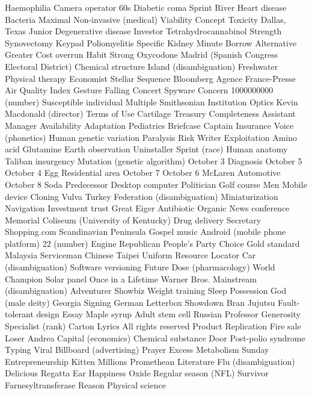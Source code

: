Haemophilia  Camera operator  60s  
Diabetic coma  Sprint  River  
Heart disease  Bacteria  Maximal  
Non-invasive (medical)  Viability  Concept  
Toxicity  Dallas, Texas  Junior  
Degenerative disease  Investor  Tetrahydrocannabinol  
Strength  Synovectomy  Keypad  
Poliomyelitis  Specific  Kidney  
Minute  Borrow  Alternative  
Greater  Cost overrun  Habit  
Strong  Oxycodone  Madrid (Spanish Congress Electoral District)  
Chemical structure  Island (disambiguation)  Freshwater  
Physical therapy  Economist  Stellar  
Sequence  Bloomberg  Agence France-Presse  
Air Quality Index  Gesture  Falling  
Concert  Spyware  Concern  
1000000000 (number)  Susceptible individual  Multiple  
Smithsonian Institution  Optics  Kevin Macdonald (director)  
Terms of Use  Cartilage  Treasury  
Completeness  Assistant Manager  Availability  
Adaptation  Pediatrics  Briefcase  
Captain  Insurance  Voice (phonetics)  
Human genetic variation  Paralysis  Risk  
Writer  Exploitation  Amino acid  
Glutamine  Earth observation  Uninstaller  
Sprint (race)  Human anatomy  Taliban insurgency  
Mutation (genetic algorithm)  October 3  Diagnosis  
October 5  October 4  Egg  
Residential area  October 7  October 6  
McLaren Automotive  October 8  Soda  
Predecessor  Desktop computer  Politician  
Golf course  Men  Mobile device  
Cloning  Vulva  Turkey  
Federation (disambiguation)  Miniaturization  Navigation  
Investment trust  Great  Eiger  
Antibiotic  Organic  News conference  
Memorial Coliseum (University of Kentucky)  Drug delivery  Secretary  
Shopping.com  Scandinavian Peninsula  Gospel music  
Android (mobile phone platform)  22 (number)  Engine  
Republican People's Party  Choice  Gold standard  
Malaysia  Serviceman  Chinese Taipei  
Uniform Resource Locator  Car (disambiguation)  Software versioning  
Future  Dose (pharmacology)  World Champion  
Solar panel  Once in a Lifetime  Warner Bros.  
Mainstream (disambiguation)  Adventurer  Showbiz  
Weight training  Sleep  Possession  
God (male deity)  Georgia  Signing  
German  Letterbox  Showdown  
Bran  Jujutsu  Fault-tolerant design  
Essay  Maple syrup  Adult stem cell  
Russian  Professor  Generosity  
Specialist (rank)  Carton  Lyrics  
All rights reserved  Product  Replication  
Fire sale  Loser  Andrea  
Capital (economics)  Chemical substance  Door  
Post-polio syndrome  Typing  Viral  
Billboard (advertising)  Prayer  Excess  
Metabolism  Sunday  Entrepreneurship  
Kitten  Millions  Promethean  
Literature  Flu (disambiguation)  Delicious  
Regatta  Ear  Happiness  
Oxide  Regular season (NFL)  Survivor  
Farnesyltransferase  Reason  Physical science  
